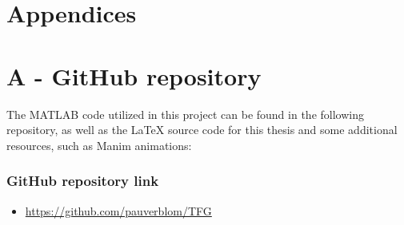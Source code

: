 \chapter*{\LARGE \textbf{Appendices}}
\fancyhf{} %
\renewcommand{\headrulewidth}{0pt} %
\fancyfoot[C]{\thepage} %

\appendix


\chapter*{A - GitHub repository}

The MATLAB code utilized in this project can be found in the following repository, as well as the LaTeX source code for this thesis and some additional resources, such as Manim animations:

\subsection*{GitHub repository link}
\begin{itemize}
    \item \url{https://github.com/pauverblom/TFG}
\end{itemize}



